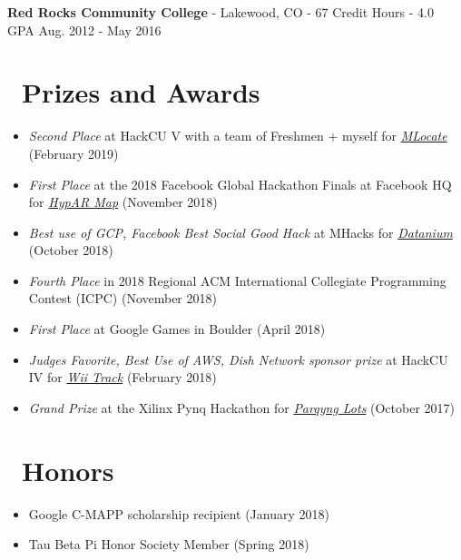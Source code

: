 \documentclass[10pt,letterpaper]{article}
\begin{document}
\vspace{2pt}
\textbf{Red Rocks Community College} - Lakewood, CO - 67 Credit Hours - 4.0 GPA
\hfill Aug. 2012 - May 2016

\section*{\faTrophy\ Prizes and Awards}
\begin{itemize}
    \item \textit{Second Place} at HackCU V with a team of Freshmen + myself
        for
        \href{https://sumnerevans.com/pages/portfolio.html#MLocate}{\textit{MLocate}}
        (February 2019)
    \item \textit{First Place} at the 2018 Facebook Global Hackathon Finals at
        Facebook HQ for
        \href{https://sumnerevans.com/pages/portfolio.html#HypAR-Map}{\textit{HypAR Map}}
        (November 2018)
    \item \textit{Best use of GCP, Facebook Best Social Good Hack} at MHacks for
        \href{https://sumnerevans.com/pages/portfolio.html#Datanium}{\textit{Datanium}}
        (October 2018)
    \item \textit{Fourth Place} in 2018 Regional ACM International Collegiate
        Programming Contest (ICPC) (November 2018)
    \item \textit{First Place} at Google Games in Boulder (April 2018)
    \item \textit{Judges Favorite, Best Use of AWS, Dish Network sponsor prize}
        at HackCU IV for
        \href{https://sumnerevans.com/pages/portfolio.html#Wii-Track}{\textit{Wii Track}}
        (February 2018)
    \item \textit{Grand Prize} at the Xilinx Pynq Hackathon for
        \href{https://sumnerevans.com/pages/portfolio.html#Parqyng-Lots}{\textit{Parqyng Lots}}
        (October 2017)
\end{itemize}

\section*{\faStar\ Honors}
\begin{itemize}
    \item Google C-MAPP scholarship recipient (January 2018)
    \item Tau Beta Pi Honor Society Member (Spring 2018)
\end{itemize}
\end{document}
